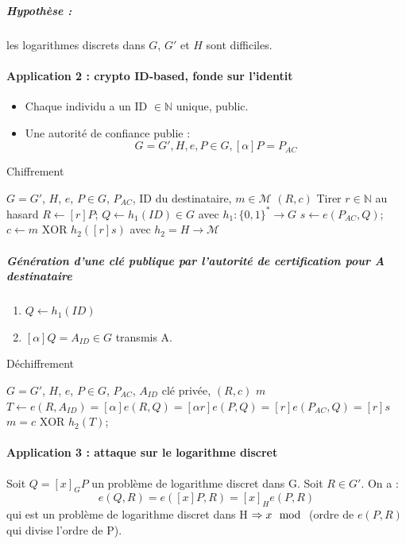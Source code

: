 \documentclass[12pt,a4paper]{report}
\begin{document}
\subparagraph{Hypothèse : } les logarithmes discrets dans $G$, $G'$ et $H$ sont difficiles.
\paragraph{Application 2 : crypto ID-based, fonde sur l'identit\\}
\begin{itemize}
\item Chaque individu a un ID $ \in \mathbb{N}$ unique, public.
\item Une autorité de confiance publie : 
$$ G=G', H, e, P\in G, [\alpha]P = P_{AC} $$
\end{itemize}

 \begin{algorithm}[ht]
\caption{Chiffrement}
\begin{algorithmic}[1]
\REQUIRE $G=G'$, $H$, $e$, $P \in G$, $P_{AC}$, ID du destinataire, $m \in \mathcal{M}$
\ENSURE $(R,c)$
\STATE Tirer $r \in \mathbb{N}$ au hasard
\STATE $R \leftarrow [r]P$;
\STATE $Q \leftarrow h_1(ID) \in G$ avec $h_1 : \{0,1\}^* \rightarrow G$
\STATE $ s \leftarrow e(P_{AC},Q)$;
\STATE $ c \leftarrow m \mbox{ XOR } h_2([r]s) $ avec $ h_2 = H \rightarrow \mathcal{M}$
\end{algorithmic}
\end{algorithm}

\subparagraph{Génération d'une clé publique par l'autorité de certification pour A destinataire\\}
\begin{enumerate}
\item $ Q \leftarrow h_1(ID)$
\item $[\alpha]Q = A_{ID} \in G $ transmis  A.
\end{enumerate}

 \begin{algorithm}[ht]
\caption{Déchiffrement}
\begin{algorithmic}[1]
\REQUIRE $G=G'$, $H$, $e$, $P \in G$, $P_{AC}$, $A_{ID}$ clé privée, $(R,c)$
\ENSURE $m$
\STATE $T \leftarrow e(R,A_{ID}) = [\alpha]e(R,Q) = [\alpha r]e(P,Q) = [r]e(P_{AC},Q) = [r]s $
\STATE $m= c \mbox{ XOR } h_2(T)$;
\end{algorithmic}
\end{algorithm}

\paragraph{Application 3 : attaque sur le logarithme discret\\}
Soit $Q = [x]_G P $ un problème de logarithme discret dans G. Soit $ R \in G'$. On a :
$$ e(Q,R) = e([x]P,R) = [x]_He(P,R)$$ qui est un problème de logarithme discret dans H $\Rightarrow  x \mod $ (ordre de $e(P,R)$ qui divise l'ordre de P).
\end{document}
